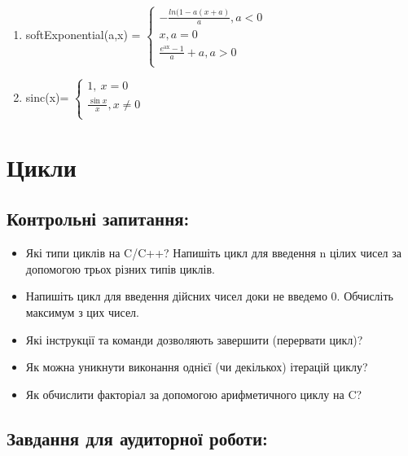 \documentclass[a5paper,titlepage,openany,twoside,
]
{book_unv}%
\makeatletter
\newcommand{\xslalph}[1]{\expandafter\@xslalph\csname c@#1\endcsname}
\newcommand{\@xslalph}[1]{%
    \ifcase#1\or а\or б\or в\or г\or д\or e\or є\or ж\or з\or i%
    \or й\or к\or л\or м\or н\or о\or п\or р\or с\or т%
    \or у\or ф\or х\or ц\or ч\or ш\or ю\or я\or аа\or бб\or вв%
    \else\@ctrerr\fi%
}
\makeatother
\begin{document}
\begin{enumerate}
\begin{enumerate}[label=\xslalph*)]
\item 
softExponential(a,x) = \(\left\{ \begin{matrix}
 - \frac{ln(1 - a(x + a)}{a},a < 0 \\
x,a = 0 \\
\frac{e^{\text{ax}} - 1}{a} + a,a > 0 \\
\end{matrix} \right.\ \)

\item 
sinc(x)= \(\left\{ \begin{matrix}
1,\ x = 0 \\
\frac{\sin x}{x},x \neq 0 \\
\end{matrix} \right.\ \)

 \end{enumerate}
\end{enumerate}


\chapter{ Цикли }
%

\section{Контрольні запитання:}
\begin{itemize}
\item
  Які типи циклів на C/C++? Напишіть цикл для введення n цілих чисел
  за допомогою трьох різних типів циклів.
\item
  Напишіть цикл для введення дійсних чисел доки не введемо 0. Обчисліть
  максимум з цих чисел.
\item
  Які інструкції та команди дозволяють завершити (перервати цикл)?
\item
  Як можна уникнути виконання однієї (чи декількох) ітерацій циклу?
\item
  Як обчислити факторіал за допомогою арифметичного циклу на C?
\end{itemize}

\section{Завдання для аудиторної роботи:}
\end{document}
